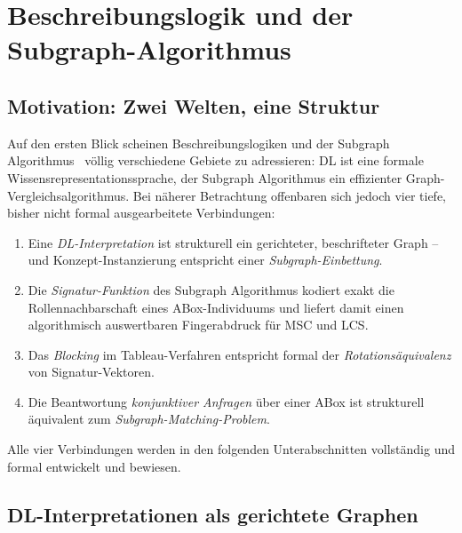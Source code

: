 ﻿\documentclass[a4paper,12pt]{article}
\theoremstyle{definition}
\theoremstyle{plain}
\theoremstyle{remark}
\begin{document}
\section{Beschreibungslogik und der Subgraph-Algo\-rith\-mus}
\label{sec:dl-subgraph}

\subsection{Motivation: Zwei Welten, eine Struktur}

Auf den ersten Blick scheinen Beschreibungslogiken und der
Subgraph Algorithmus~\cite{Epp2026} v{\"o}llig verschiedene Gebiete
zu adressieren: DL ist eine formale Wissensrepresentationssprache,
der Subgraph Algorithmus ein effizienter Graph-Vergleichsalgorithmus.
Bei n{\"a}herer Betrachtung offenbaren sich jedoch vier tiefe,
bisher nicht formal ausgearbeitete Verbindungen:

\begin{enumerate}[label=(\Roman*)]
  \item Eine \emph{DL-Interpretation} ist strukturell ein
        gerichteter, beschrifteter Graph -- und Konzept-Instanzierung
        entspricht einer \emph{Subgraph-Einbettung}.
  \item Die \emph{Signatur-Funktion} des Subgraph Algorithmus
        kodiert exakt die Rollennachbarschaft eines ABox-Individuums
        und liefert damit einen algorithmisch auswertbaren
        Fingerabdruck f{\"u}r MSC und LCS.
  \item Das \emph{Blocking} im Tableau-Verfahren entspricht
        formal der \emph{Rotations{\"a}quivalenz} von Signatur-Vektoren.
  \item Die Beantwortung \emph{konjunktiver Anfragen} {\"u}ber einer
        ABox ist strukturell {\"a}quivalent zum
        \emph{Subgraph-Matching-Problem}.
\end{enumerate}

Alle vier Verbindungen werden in den folgenden Unterabschnitten
vollst{\"a}ndig und formal entwickelt und bewiesen.

\subsection{DL-Interpretationen als gerichtete Graphen}
\label{sec:dl-graph}
\end{document}
